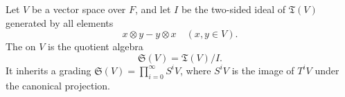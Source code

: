 Let $V$ be a vector space over $F$, and let $I$ be the two-sided ideal of $\mathfrak{T}(V)$ generated by all elements
$$
x \otimes y - y \otimes x \quad (x, y \in V).
$$
The  on $V$ is the quotient algebra
$$
\mathfrak{S}(V) = \mathfrak{T}(V)/I.
$$
It inherits a grading $\mathfrak{S}(V) = \prod_{i=0}^{\infty} S^iV$, where $S^iV$ is the image of $T^iV$ under the canonical projection.
